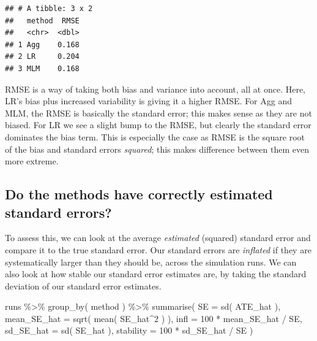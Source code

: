 \documentclass[
]{book}
\newenvironment{Shaded}{\begin{snugshade}}{\end{snugshade}}
\newcommand{\AttributeTok}[1]{\textcolor[rgb]{0.77,0.63,0.00}{#1}}
\newcommand{\DecValTok}[1]{\textcolor[rgb]{0.00,0.00,0.81}{#1}}
\newcommand{\FunctionTok}[1]{\textcolor[rgb]{0.00,0.00,0.00}{#1}}
\newcommand{\NormalTok}[1]{#1}
\newcommand{\SpecialCharTok}[1]{\textcolor[rgb]{0.00,0.00,0.00}{#1}}
\begin{document}
\begin{verbatim}
## # A tibble: 3 x 2
##   method  RMSE
##   <chr>  <dbl>
## 1 Agg    0.168
## 2 LR     0.204
## 3 MLM    0.168
\end{verbatim}

RMSE is a way of taking both bias and variance into account, all at once.
Here, LR's bias plus increased variability is giving it a higher RMSE.
For Agg and MLM, the RMSE is basically the standard error; this makes sense as they are not biased.
For LR we see a slight bump to the RMSE, but clearly the standard error dominates the bias term.
This is especially the case as RMSE is the square root of the bias and standard errors \emph{squared}; this makes difference between them even more extreme.

\hypertarget{do-the-methods-have-correctly-estimated-standard-errors}{%
\subsection{Do the methods have correctly estimated standard errors?}\label{do-the-methods-have-correctly-estimated-standard-errors}}

To assess this, we can look at the average \emph{estimated} (squared) standard error and compare it to the true standard error.
Our standard errors are \emph{inflated} if they are systematically larger than they should be, across the simulation runs.
We can also look at how stable our standard error estimates are, by taking the standard deviation of our standard error estimates.

\begin{Shaded}
\begin{Highlighting}[]
\NormalTok{runs }\SpecialCharTok{\%\textgreater{}\%}  \FunctionTok{group\_by}\NormalTok{( method ) }\SpecialCharTok{\%\textgreater{}\%}
  \FunctionTok{summarise}\NormalTok{( }
    \AttributeTok{SE =} \FunctionTok{sd}\NormalTok{( ATE\_hat ),}
    \AttributeTok{mean\_SE\_hat =} \FunctionTok{sqrt}\NormalTok{( }\FunctionTok{mean}\NormalTok{( SE\_hat}\SpecialCharTok{\^{}}\DecValTok{2}\NormalTok{ ) ),}
    \AttributeTok{infl =} \DecValTok{100} \SpecialCharTok{*}\NormalTok{ mean\_SE\_hat }\SpecialCharTok{/}\NormalTok{ SE,}
    \AttributeTok{sd\_SE\_hat =} \FunctionTok{sd}\NormalTok{( SE\_hat ),}
    \AttributeTok{stability =} \DecValTok{100} \SpecialCharTok{*}\NormalTok{ sd\_SE\_hat }\SpecialCharTok{/}\NormalTok{ SE )}
\end{Highlighting}
\end{Shaded}
\end{document}
